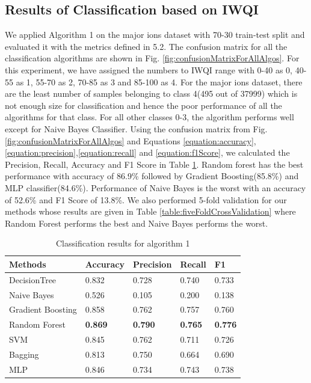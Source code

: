 \subsection{Results of Classification based on IWQI}
\label{subsection:resultsOfClassificationBasedOnIWQI}
We applied Algorithm 1 on the major ions dataset with 70-30 train-test split and evaluated it with the metrics defined in 5.2. The confusion matrix for all the classification algorithms are shown in Fig. \ref{fig:confusionMatrixForAllAlgos}. For this experiment, we have assigned the numbers to IWQI range with 0-40 as 0, 40-55 as 1, 55-70 as 2, 70-85 as 3 and 85-100 as 4. For the major ions dataset, there are the least number of samples belonging to class 4(495 out of 37999) which is not enough size for classification and hence the poor performance of all the algorithms for that class. For all other classes 0-3, the algorithm performs well except for Naive Bayes Classifier. Using the confusion matrix from Fig. \ref{fig:confusionMatrixForAllAlgos} and Equations \ref{equation:accuracy},\ref{equation:precision},\ref{equation:recall} and \ref{equation:f1Score}, we calculated the Precision, Recall, Accuracy and F1 Score in Table \ref{table:classificationResults}. Random forest has the best performance with accuracy of 86.9\% followed by Gradient Boosting(85.8\%) and MLP classifier(84.6\%). Performance of Naive Bayes is the worst with an accuracy of 52.6\% and F1 Score of 13.8\%. We also performed 5-fold validation for our methods whose results are given in Table \ref{table:fiveFoldCrossValidation} where Random Forest performs the best and Naive Bayes performs the worst.

\begin{table}[H]
    \centering
    \begin{tabular}{|l|l|l|l|l|}
    \hline
        \textbf{Methods} & \textbf{Accuracy} & \textbf{Precision} & \textbf{Recall} & \textbf{F1} \\ \hline
        DecisionTree & 0.832 & 0.728 & 0.740 & 0.733 \\ \hline
        Naive Bayes & 0.526 & 0.105 & 0.200 & 0.138 \\ \hline
        Gradient Boosting & 0.858 & 0.762 & 0.757 & 0.760 \\ \hline
        Random Forest & \textbf{0.869} & \textbf{0.790} & \textbf{0.765} & \textbf{0.776} \\ \hline
        SVM & 0.845 & 0.762 & 0.711 & 0.726 \\ \hline
        Bagging & 0.813 & 0.750 & 0.664 & 0.690 \\ \hline
        MLP & 0.846 & 0.734 & 0.743 & 0.738 \\ \hline
    \end{tabular}
    \caption{Classification results for algorithm 1}
    \label{table:classificationResults}
\end{table}

